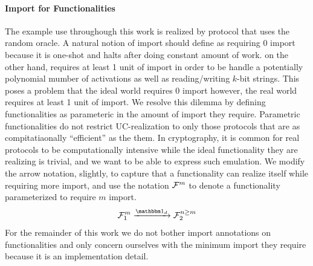 \paragraph{Import for Functionalities}
The \Fcom example use throughough this work is realized by protocol that uses the random oracle. 
A natural notion of import should define \Fcom as requiring 0 import because it is one-shot and halts after doing constant amount of work.
\Fro on the other hand, requires at least 1 unit of import in order to be handle a potentially polynomial mumber of activations as well as reading/writing $k$-bit strings.
This poses a problem that the ideal world requires 0 import however, the real world requires at least 1 unit of import.
We resolve this dilemma by defining functionalities as parameteric in the amount of import they require.
Parametric functionalities do not restrict UC-realization to only those protocols that are as compitatiaonally ``efficient'' as the them. In cryptography, it is common for real protocols to be computationally intensive while the ideal functionality they are realizing is trivial, and we want to be able to express such emulation.
We modify the arrow notation, slightly, to capture that a functionality can realize itself while requiring more import, and use the notation $\mathcal{F}^m$ to denote a functionality parameterized to require $m$ import.
\[
	\F_1^m \xrightarrow{\idealP} \F_2^{n \geq m}
\]
For the remainder of this work we do not bother import annotations on functionalities and only concern ourselves with the minimum import they require because it is an implementation detail.


%

